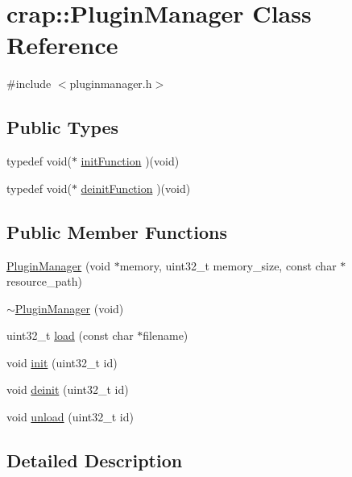 \hypertarget{classcrap_1_1_plugin_manager}{\section{crap\+:\+:Plugin\+Manager Class Reference}
\label{classcrap_1_1_plugin_manager}
}


{\ttfamily \#include $<$pluginmanager.\+h$>$}

\subsection*{Public Types}
\begin{DoxyCompactItemize}
\item 
typedef void($\ast$ \hyperlink{classcrap_1_1_plugin_manager_a7b629b34ba99c8f47bfcb162aede7ad3}{init\+Function} )(void)
\item 
typedef void($\ast$ \hyperlink{classcrap_1_1_plugin_manager_a47c660838174ddcbcce80021757fb3a2}{deinit\+Function} )(void)
\end{DoxyCompactItemize}
\subsection*{Public Member Functions}
\begin{DoxyCompactItemize}
\item 
\hyperlink{classcrap_1_1_plugin_manager_ab5139f73c8d354724ffdc1f2c78b1494}{Plugin\+Manager} (void $\ast$memory, uint32\+\_\+t memory\+\_\+size, const char $\ast$resource\+\_\+path)
\item 
\hyperlink{classcrap_1_1_plugin_manager_ab869462fb661b66250993fce61e79aa6}{$\sim$\+Plugin\+Manager} (void)
\item 
uint32\+\_\+t \hyperlink{classcrap_1_1_plugin_manager_a032a19b50c263c5aa16275bff27f40d9}{load} (const char $\ast$filename)
\item 
void \hyperlink{classcrap_1_1_plugin_manager_aeeb4e23438881a48fa0bda0b1885a188}{init} (uint32\+\_\+t id)
\item 
void \hyperlink{classcrap_1_1_plugin_manager_a3e26eecc143191eeb14945ccd4e51e83}{deinit} (uint32\+\_\+t id)
\item 
void \hyperlink{classcrap_1_1_plugin_manager_a8d7bf2d50979c84ccd4c669e1fc89f16}{unload} (uint32\+\_\+t id)
\end{DoxyCompactItemize}


\subsection{Detailed Description}


